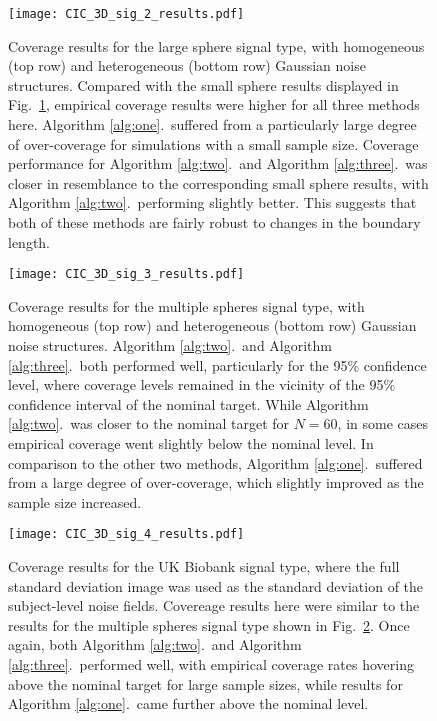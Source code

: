 \clearpage

\begin{figure}[!htbp]
\hspace*{-3.0cm}
\centering
    \texttt{[image: CIC\_3D\_sig\_2\_results.pdf]}
\caption{Coverage results for the large sphere signal type, with homogeneous (top row) and heterogeneous (bottom row) Gaussian noise structures. Compared with the small sphere results displayed in Fig.\ \ref{fig:Cohen_3D_sig_2_results}, empirical coverage results were higher for all three methods here. Algorithm \ref{alg:one}.\ suffered from a particularly large degree of over-coverage for simulations with a small sample size. Coverage performance for Algorithm \ref{alg:two}.\ and Algorithm \ref{alg:three}.\ was closer in resemblance to the corresponding small sphere results, with Algorithm \ref{alg:two}.\ performing slightly better. This suggests that both of these methods are fairly robust to changes in the boundary length.} 
\label{fig:Cohen_3D_sig_2_results}
\end{figure}

\clearpage

\begin{figure}[!htbp]
\hspace*{-3.0cm}
\centering
    \texttt{[image: CIC\_3D\_sig\_3\_results.pdf]}
\caption{Coverage results for the multiple spheres signal type, with homogeneous (top row) and heterogeneous (bottom row) Gaussian noise structures. Algorithm \ref{alg:two}.\ and Algorithm \ref{alg:three}.\ both performed well, particularly for the 95\% confidence level, where coverage levels remained in the vicinity of the 95\% confidence interval of the nominal target. While Algorithm \ref{alg:two}.\ was closer to the nominal target for $N = 60$, in some cases empirical coverage went slightly below the nominal level. In comparison to the other two methods, Algorithm \ref{alg:one}.\ suffered from a large degree of over-coverage, which slightly improved as the sample size increased.}
\label{fig:Cohen_3D_sig_3_results}
\end{figure}

\clearpage

\begin{figure}[!htbp]
\hspace*{-3.0cm}
\centering
    \texttt{[image: CIC\_3D\_sig\_4\_results.pdf]}
\caption{Coverage results for the UK Biobank signal type, where the full standard deviation image was used as the standard deviation of the subject-level noise fields. Covereage results here were similar to the results for the multiple spheres signal type shown in Fig.\ \ref{fig:Cohen_3D_sig_3_results}. Once again, both Algorithm \ref{alg:two}.\ and Algorithm \ref{alg:three}.\ performed well, with empirical coverage rates hovering above the nominal target for large sample sizes, while results for Algorithm \ref{alg:one}.\ came further above the nominal level.}
\label{fig:Cohen_3D_sig_4_results}
\end{figure}

